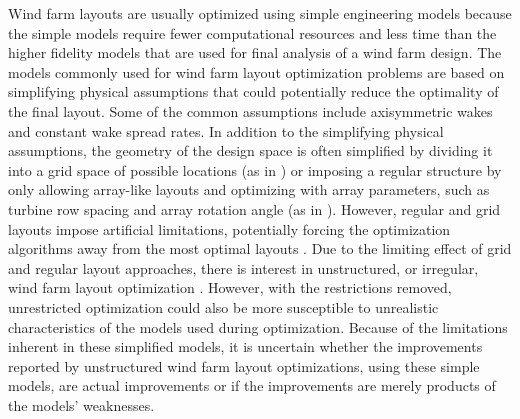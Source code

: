 \documentclass[conf]{new-aiaa}
\begin{document}
Wind farm layouts are usually optimized using simple engineering models because the simple models require fewer computational resources and less time than the higher fidelity models that are used for final analysis of a wind farm design. The models commonly used for wind farm layout optimization problems are based on simplifying physical assumptions that could potentially reduce the optimality of the final layout. Some of the common assumptions include axisymmetric wakes and constant wake spread rates. In addition to the simplifying physical assumptions, the geometry of the design space is often simplified by dividing it into a grid space of possible locations (as in \cite{mosetti1994,grady2005,elkinton2008,gonzalez2010,moorthy2014,turner2014-grid-milp-wflo}) or imposing a regular structure by only allowing array-like layouts and optimizing with array parameters, such as turbine row spacing and array rotation angle (as in \cite{perez-moreno2018}). However, regular and grid layouts impose artificial limitations, potentially forcing the optimization algorithms away from the most optimal layouts \cite{chowdhury2012}. Due to the limiting effect of grid and regular layout approaches, there is interest in unstructured, or irregular, wind farm layout optimization \cite{chowdhury2012,rethore2014,fleming2015,guirguis2016,gebraad2017-max-aep,perez-moreno2018}. However, with the restrictions removed, unrestricted optimization could also be more susceptible to unrealistic characteristics of the models used during optimization. Because of the limitations inherent in these simplified models, it is uncertain whether the improvements reported by unstructured wind farm layout optimizations, using these simple models, are actual improvements or if the improvements are merely products of the models' weaknesses. 
\end{document}
